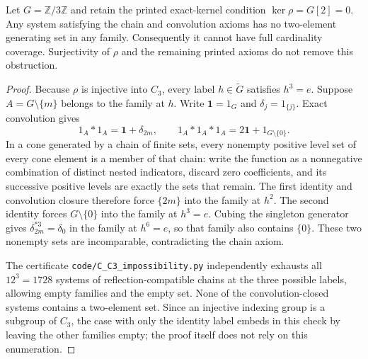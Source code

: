 \begin{proposition}
\label{C:C3-coverage-obstruction}
Let $G=\mathbb Z/3\mathbb Z$ and retain the printed exact-kernel condition $\ker\rho=G[2]=0$. Any system satisfying the chain and convolution axioms has no two-element generating set in any family. Consequently it cannot have full cardinality coverage. Surjectivity of $\rho$ and the remaining printed axioms do not remove this obstruction.
\end{proposition}
\begin{proof}
Because $\rho$ is injective into $C_3$, every label $h\in\widetilde G$ satisfies $h^3=e$. Suppose $A=G\setminus\{m\}$ belongs to the family at $h$. Write $\mathbf1=1_G$ and $\delta_j=1_{\{j\}}$. Exact convolution gives
\[
 1_A*1_A=\mathbf1+\delta_{2m},\qquad
 1_A*1_A*1_A=2\mathbf1+1_{G\setminus\{0\}}.
\]
In a cone generated by a chain of finite sets, every nonempty positive level set of every cone element is a member of that chain: write the function as a nonnegative combination of distinct nested indicators, discard zero coefficients, and its successive positive levels are exactly the sets that remain. The first identity and convolution closure therefore force $\{2m\}$ into the family at $h^2$. The second identity forces $G\setminus\{0\}$ into the family at $h^3=e$. Cubing the singleton generator gives $\delta_{2m}^{*3}=\delta_0$ in the family at $h^6=e$, so that family also contains $\{0\}$. These two nonempty sets are incomparable, contradicting the chain axiom.

The certificate \texttt{code/C\_C3\_impossibility.py} independently exhausts all $12^3=1728$ systems of reflection-compatible chains at the three possible labels, allowing empty families and the empty set. None of the convolution-closed systems contains a two-element set. Since an injective indexing group is a subgroup of $C_3$, the case with only the identity label embeds in this check by leaving the other families empty; the proof itself does not rely on this enumeration.
\end{proof}

